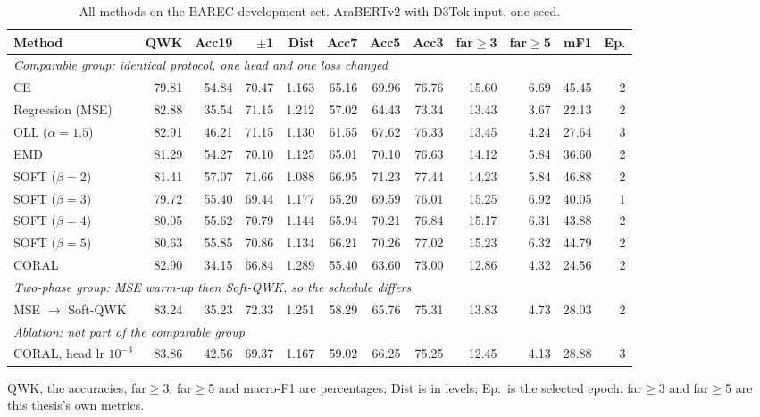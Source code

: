 \begin{table}[H]
\centering
\footnotesize
\caption{All methods on the BAREC development set. AraBERTv2 with D3Tok input, one seed.}
\label{tab:res-main-dev}
\begin{tabular}{lrrrrrrrrrrr}
\toprule
\textbf{Method} & \textbf{QWK} & \textbf{Acc19} & \textbf{$\pm$1} & \textbf{Dist} & \textbf{Acc7} & \textbf{Acc5} & \textbf{Acc3} & \textbf{far$\geq$3} & \textbf{far$\geq$5} & \textbf{mF1} & \textbf{Ep.} \\
\midrule
\multicolumn{12}{l}{\textit{Comparable group: identical protocol, one head and one loss changed}} \\
\midrule
CE & 79.81 & 54.84 & 70.47 & 1.163 & 65.16 & 69.96 & 76.76 & 15.60 & 6.69 & 45.45 & 2 \\
Regression (MSE) & 82.88 & 35.54 & 71.15 & 1.212 & 57.02 & 64.43 & 73.34 & 13.43 & 3.67 & 22.13 & 2 \\
OLL ($\alpha=1.5$) & 82.91 & 46.21 & 71.15 & 1.130 & 61.55 & 67.62 & 76.33 & 13.45 & 4.24 & 27.64 & 3 \\
EMD & 81.29 & 54.27 & 70.10 & 1.125 & 65.01 & 70.10 & 76.63 & 14.12 & 5.84 & 36.60 & 2 \\
SOFT ($\beta=2$) & 81.41 & 57.07 & 71.66 & 1.088 & 66.95 & 71.23 & 77.44 & 14.23 & 5.84 & 46.88 & 2 \\
SOFT ($\beta=3$) & 79.72 & 55.40 & 69.44 & 1.177 & 65.20 & 69.59 & 76.01 & 15.25 & 6.92 & 40.05 & 1 \\
SOFT ($\beta=4$) & 80.05 & 55.62 & 70.79 & 1.144 & 65.94 & 70.21 & 76.84 & 15.17 & 6.31 & 43.88 & 2 \\
SOFT ($\beta=5$) & 80.63 & 55.85 & 70.86 & 1.134 & 66.21 & 70.26 & 77.02 & 15.23 & 6.32 & 44.79 & 2 \\
CORAL & 82.90 & 34.15 & 66.84 & 1.289 & 55.40 & 63.60 & 73.00 & 12.86 & 4.32 & 24.56 & 2 \\
\midrule
\multicolumn{12}{l}{\textit{Two-phase group: MSE warm-up then Soft-QWK, so the schedule differs}} \\
\midrule
MSE $\rightarrow$ Soft-QWK & 83.24 & 35.23 & 72.33 & 1.251 & 58.29 & 65.76 & 75.31 & 13.83 & 4.73 & 28.03 & 2 \\
\midrule
\multicolumn{12}{l}{\textit{Ablation: not part of the comparable group}} \\
\midrule
CORAL, head lr $10^{-3}$ & 83.86 & 42.56 & 69.37 & 1.167 & 59.02 & 66.25 & 75.25 & 12.45 & 4.13 & 28.88 & 3 \\
\bottomrule
\end{tabular}

\vspace{0.1cm}
{\footnotesize QWK, the accuracies, far$\geq$3, far$\geq$5 and macro-F1 are percentages; Dist is in levels; Ep.\ is the selected epoch. far$\geq$3 and far$\geq$5 are this thesis's own metrics.}
\end{table}
